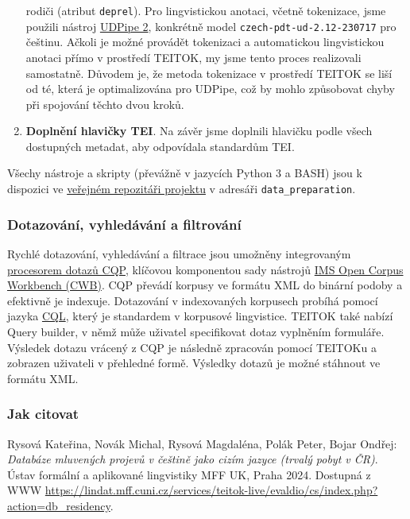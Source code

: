 \documentclass[
]{article}
\begin{document}
\begin{enumerate}
  rodiči (atribut \texttt{deprel}). Pro lingvistickou anotaci, včetně
  tokenizace, jsme použili nástroj
  \href{https://ufal.mff.cuni.cz/udpipe/2}{UDPipe 2}, konkrétně model
  \texttt{czech-pdt-ud-2.12-230717} pro češtinu. Ačkoli je možné
  provádět tokenizaci a automatickou lingvistickou anotaci přímo v
  prostředí TEITOK, my jsme tento proces realizovali samostatně. Důvodem
  je, že metoda tokenizace v prostředí TEITOK se liší od té, která je
  optimalizována pro UDPipe, což by mohlo způsobovat chyby při spojování
  těchto dvou kroků.
\item
  \textbf{Doplnění hlavičky TEI}. Na závěr jsme doplnili hlavičku podle
  všech dostupných metadat, aby odpovídala standardům TEI.
\end{enumerate}

Všechy nástroje a skripty (převážně v jazycích Python 3 a BASH) jsou k
dispozici ve \href{https://github.com/ufal/evaldio}{veřejném repozitáři
projektu} v adresáři \texttt{data\_preparation}.

\hypertarget{dotazovuxe1nuxed-vyhleduxe1vuxe1nuxed-a-filtrovuxe1nuxed}{%
\subsubsection{Dotazování, vyhledávání a
filtrování}\label{dotazovuxe1nuxed-vyhleduxe1vuxe1nuxed-a-filtrovuxe1nuxed}}

Rychlé dotazování, vyhledávání a filtrace jsou umožněny integrovaným
\href{https://cwb.sourceforge.io/files/CQP_Manual.pdf}{procesorem dotazů
CQP}, klíčovou komponentou sady nástrojů
\href{https://cwb.sourceforge.io/}{IMS Open Corpus Workbench (CWB)}. CQP
převádí korpusy ve formátu XML do binární podoby a efektivně je
indexuje. Dotazování v indexovaných korpusech probíhá pomocí jazyka
\href{https://www.cambridge.org/sketch/help/userguides/CQL\%20Help\%201.3.pdf}{CQL},
který je standardem v korpusové lingvistice. TEITOK také nabízí Query
builder, v němž může uživatel specifikovat dotaz vyplněním formuláře.
Výsledek dotazu vrácený z CQP je následně zpracován pomocí TEITOKu a
zobrazen uživateli v přehledné formě. Výsledky dotazů je možné stáhnout
ve formátu XML.

\hypertarget{jak-citovat}{%
\subsubsection{Jak citovat}\label{jak-citovat}}

Rysová Kateřina, Novák Michal, Rysová Magdaléna, Polák Peter, Bojar
Ondřej: \emph{Databáze mluvených projevů v češtině jako cizím jazyce
(trvalý pobyt v ČR)}. Ústav formální a aplikované lingvistiky MFF UK,
Praha 2024. Dostupná z WWW
\url{https://lindat.mff.cuni.cz/services/teitok-live/evaldio/cs/index.php?action=db_residency}.
\end{document}
